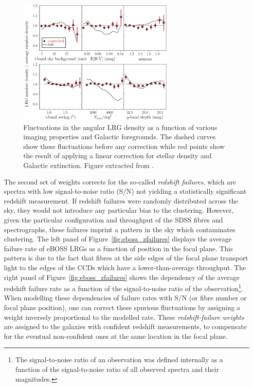 \begin{figure}
    \centering 
    \includegraphics[width=0.7\textwidth]{fig/galaxies/photometric_weights_lrg.png}
    \caption{ Fluctuations in the angular LRG density as a function of 
    various imaging properties and Galactic foregrounds. 
    The dashed curves show these fluctuations before any correction 
    while red points show the result of applying a linear correction for 
    stellar density and Galactic extinction. 
    Figure extracted from \cite{rossCompletedSDSSIVExtended2020}.} 
    \label{fig:photo_systematics_lrg}
\end{figure}

The second set of weights corrects for the so-called \emph{redshift failures}, 
which are spectra with low signal-to-noise ratio (S/N)
not yielding a statistically significant redshift measurement. 
If redshift failures were randomly distributed across the sky, 
they would not introduce any particular bias to the clustering. 
However, given the particular configuration and throughput of the SDSS fibres and spectrographs, 
these failures imprint a pattern in the sky which contaminates clustering. 
The left panel of Figure~\ref{fig:eboss_zfailures} displays the average failure rate 
of eBOSS LRGs as a function of position in the focal plane. 
This pattern is due to the fact that fibres at the side edges of the focal plane 
transport light to the edges of the CCDs which have a lower-than-average throughput. 
The right panel of Figure~\ref{fig:eboss_zfailures} shows the 
dependency of the average redshift failure rate as a function of the signal-to-noise
ratio of the observation\footnote{The signal-to-noise ratio of an observation was 
defined internally as a function of the signal-to-noise ratio of all observed 
spectra and their magnitudes.}.
When modelling these dependencies of failure rates with S/N (or fibre number or focal plane
position), one can correct these spurious fluctuations by assigning a weight 
inversely proportional to the modelled rate. 
These \emph{redshift-failure weights} are assigned to the 
galaxies with confident redshift measurements, to compensate for the eventual 
non-confident ones at the same location in the focal plane. 

